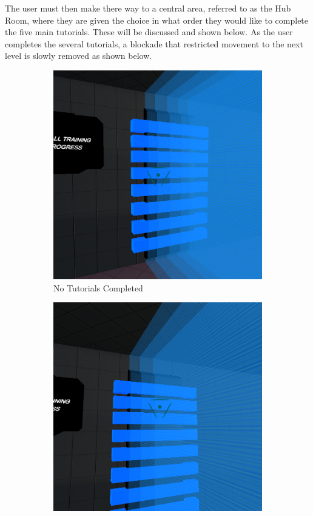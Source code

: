 \noindent The user must then make there way to a central area, referred to as the Hub Room, where they are given the choice in what order they would like to complete the five main tutorials. These will be discussed and shown below. As the user completes the several tutorials, a blockade that restricted movement to the next level is slowly removed as shown below.

\begin{figure}[H]
\centering
\begin{subfigure}{0.3\textwidth}
  \centering
  \includegraphics[width=0.9\linewidth]{Figures/barrier5.png}
  \caption{No Tutorials Completed}
\end{subfigure}%
\begin{subfigure}{0.3\textwidth}
  \centering
  \includegraphics[width=0.9\linewidth]{Figures/barrier3.png}

\end{subfigure}
\end{figure}
